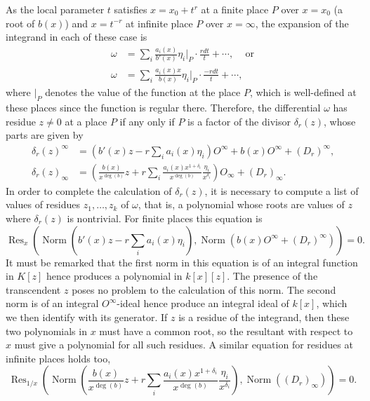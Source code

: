 \documentclass[12pt,reqno]{amsart}
\numberwithin{equation}{section}
\newcommand{\op}[1]  { \operatorname{ #1 }}
\begin{document}
As the local parameter $t$ satisfies $x=x_0+t^r$ at a finite place $P$ over $x=x_0$ (a root of $b(x)$) and $x=t^{-r}$ at infinite place $P$ over $x=\infty$, the expansion of the integrand in each of these case is
\begin{align*}
 \omega &= \sum_i \frac{a_i(x)}{b'(x)} \eta_i \Big|_P \cdot \frac{r dt}{t} + \cdots \text{,} \quad \text{ or}\\
 \omega &= \sum_i \frac{a_i(x) x}{b(x)} \eta_i \Big|_P \cdot \frac{-r dt}{t} + \cdots \text{,}
\end{align*}
where $|_{P}$ denotes the value of the function at the place $P$, which is well-defined at these places since the function is regular there. Therefore, the differential $\omega$ has residue $z \ne 0$ at a place $P$ if any only if $P$ is a factor of the divisor $\delta_r(z)$, whose parts are given by
\begin{align*}
 \delta_r(z)^{\infty} &= (b'(x) z-r \sum_i a_i(x) \eta_i) O^{\infty} + b(x) O^{\infty} + (D_r)^{\infty}\text{,}\\
 \delta_r(z)_{\infty} &= (\frac{b(x)}{x^{\op{deg}(b)}} z+r \sum_i \frac{a_i(x)x^{1+\delta_i}}{x^{\op{deg}(b)}} \frac{\eta_i}{x^{\delta_i}}) O_{\infty} + (D_r)_{\infty}\text{.}
\end{align*}
In order to complete the calculation of $\delta_r(z)$, it is necessary to compute a list of values of residues $z_1,\dots,z_k$ of $\omega$, that is, a polynomial whose roots are values of $z$ where $\delta_r(z)$ is nontrivial. For finite places this equation is
\begin{equation}
\label{equ_root1}
 \op{Res}_x \left( \op{Norm}(b'(x) z-r \sum_i a_i(x) \eta_i), \op{Norm}(b(x) O^{\infty} + (D_r)^{\infty}) \right)=0\text{.}
\end{equation}
It must be remarked that the first norm in this equation is of an integral function in $K[z]$ hence produces a polynomial in $k[x][z]$. The presence of the transcendent $z$ poses no problem to the calculation of this norm. The second norm is of an integral $O^{\infty}$-ideal hence produce an integral ideal of $k[x]$, which we then identify with its generator. If $z$ is a residue of the integrand, then these two polynomials in $x$ must have a common root, so the resultant with respect to $x$ must give a polynomial for all such residues. A similar equation for residues at infinite places holds too,
\begin{equation}
\label{equ_root2}
  \op{Res}_{1/x} \left( \op{Norm}(\frac{b(x)}{x^{\op{deg}(b)}} z+r \sum_i \frac{a_i(x)x^{1+\delta_i}}{x^{\op{deg}(b)}} \frac{\eta_i}{x^{\delta_i}}) ,\op{Norm}((D_r)_{\infty}) \right)=0\text{.}
\end{equation}
\end{document}
